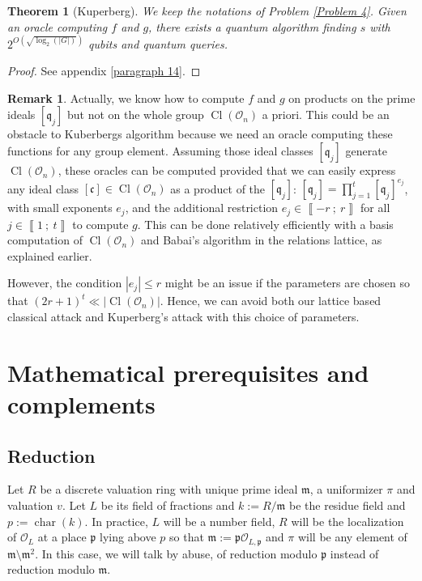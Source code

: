 \documentclass[a4paper,10pt]{report}
\theoremstyle{definition}
\theoremstyle{plain}
\newtheorem{Theorem}[Definition]{Theorem}
\theoremstyle{definition}
\newtheorem{Remark}[Definition]{Remark}
\newcommand{\mO}{\mathcal{O}}
\renewcommand{\i}[2]{\left\llbracket #1~;~#2\right\rrbracket}
\renewcommand{\(}{\left(}
\renewcommand{\)}{\right)}
\newcommand{\mf}[1]{\mathfrak{#1}}
\newcommand{\mfm}{\mathfrak{m}}
\newcommand{\mfp}{\mathfrak{p}}
\DeclareMathOperator{\Cl}{Cl}
\DeclareMathOperator{\Char}{char}%
\begin{document}
\begin{Theorem}[Kuperberg]
We keep the notations of Problem \ref{Problem 4}. Given an oracle computing $f$ and $g$, there exists a quantum algorithm finding $s$ with $2^{O(\sqrt{\log_2(|G|)})}$ qubits and quantum queries.
\end{Theorem}

\begin{proof}
See appendix \ref{paragraph 14}.
\end{proof}

\begin{Remark}
Actually, we know how to compute $f$ and $g$ on products on the prime ideals $[\mf{q}_j]$ but not on the whole group $\Cl(\mO_n)$ a priori. This could be an obstacle to Kuberbergs algorithm because we need an oracle computing these functions for any group element. Assuming those ideal classes $[\mf{q}_j]$ generate $\Cl(\mO_n)$, these oracles can be computed provided that we can easily express any ideal class $[\mf{c}]\in \Cl(\mO_n)$ as a product of the $[\mf{q}_j]$: $[\mf{q}_j]=\prod_{j=1}^t[\mf{q}_j]^{e_j}$, with small exponents $e_j$, and the additional restriction $e_j\in\i{-r}{r}$ for all $j\in\i{1}{t}$ to compute $g$. This can be done relatively efficiently with a basis computation of $\Cl(\mO_n)$ and Babai's algorithm in the relations lattice, as explained earlier.  

However, the condition $|e_j|\leq r$ might be an issue if the parameters are chosen so that $(2r+1)^t\ll |\Cl(\mO_n)|$. Hence, we can avoid both our lattice based classical attack and Kuperberg's attack with this choice of parameters.
\end{Remark}






\appendix

\chapter{Mathematical prerequisites and complements}

\section{Reduction}

Let $R$ be a discrete valuation ring with unique prime ideal $\mf{m}$,  a uniformizer $\pi$ and valuation $v$.  Let $L$ be its field of fractions and $k:=R/\mfm$ be the residue field and $p:=\Char(k)$.  In practice,  $L$ will be a number field, $R$ will be the localization of $\mO_L$ at a place $\mfp$ lying above $p$ so that $\mfm:=\mfp\mO_{L,\mfp}$ and $\pi$ will be any element of $\mfm\setminus\mfm^2$.  In this case, we will talk by abuse, of reduction modulo $\mfp$ instead of reduction modulo $\mfm$. 
\end{document}
